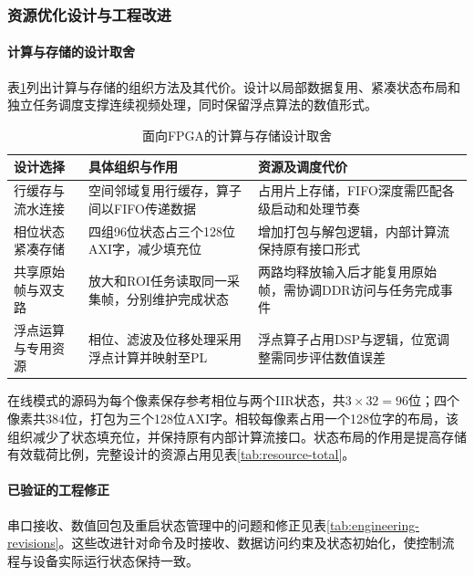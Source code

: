 \subsubsection{资源优化设计与工程改进}
\paragraph{计算与存储的设计取舍}
表\ref{tab:design-tradeoffs}列出计算与存储的组织方法及其代价。设计以局部数据复用、紧凑状态布局和独立任务调度支撑连续视频处理，同时保留浮点算法的数值形式。

\begin{table}[htbp]
\centering\small
\caption{面向FPGA的计算与存储设计取舍}\label{tab:design-tradeoffs}
\begin{tabularx}{\linewidth}{@{}p{2.5cm}X X@{}}
\toprule
设计选择 & 具体组织与作用 & 资源及调度代价 \\
\midrule
行缓存与流水连接 & 空间邻域复用行缓存，算子间以FIFO传递数据 & 占用片上存储，FIFO深度需匹配各级启动和处理节奏 \\
相位状态紧凑存储 & 四组96位状态占三个128位AXI字，减少填充位 & 增加打包与解包逻辑，内部计算流保持原有接口形式 \\
共享原始帧与双支路 & 放大和ROI任务读取同一采集帧，分别维护完成状态 & 两路均释放输入后才能复用原始帧，需协调DDR访问与任务完成事件 \\
浮点运算与专用资源 & 相位、滤波及位移处理采用浮点计算并映射至PL & 浮点算子占用DSP与逻辑，位宽调整需同步评估数值误差 \\
\bottomrule
\end{tabularx}
\end{table}

在线模式的源码为每个像素保存参考相位与两个IIR状态，共$3\times32=96$位；四个像素共384位，打包为三个128位AXI字。相较每像素占用一个128位字的布局，该组织减少了状态填充位，并保持原有内部计算流接口。状态布局的作用是提高存储有效载荷比例，完整设计的资源占用见表\ref{tab:resource-total}。

\paragraph{已验证的工程修正}
串口接收、数值回包及重启状态管理中的问题和修正见表\ref{tab:engineering-revisions}。这些改进针对命令及时接收、数据访问约束及状态初始化，使控制流程与设备实际运行状态保持一致。

